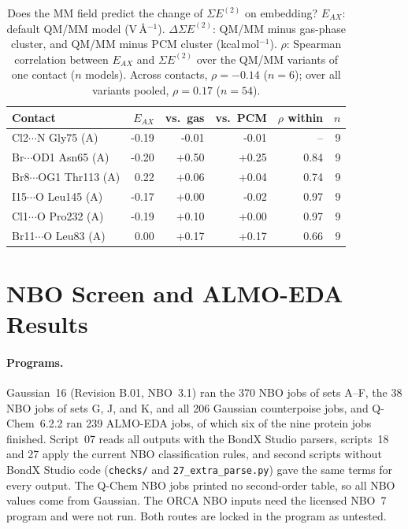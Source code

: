 \documentclass[journal=jcisd8,manuscript=suppinfo]{achemso}
\newcommand{\BX}{BondX Studio}
\begin{document}
\begin{singlespace}
\begin{table}[!htbp]\centering\small
\caption{Does the MM field predict the change of $\Sigma E^{(2)}$ on embedding? $E_{AX}$: default QM/MM model (V\,\AA$^{-1}$). $\Delta\Sigma E^{(2)}$: QM/MM minus gas-phase cluster, and QM/MM minus PCM cluster (kcal\,mol$^{-1}$). $\rho$: Spearman correlation between $E_{AX}$ and $\Sigma E^{(2)}$ over the QM/MM variants of one contact ($n$ models). Across contacts, $\rho = -0.14$ ($n = 6$); over all variants pooled, $\rho = 0.17$ ($n = 54$).}\label{tab:m12}
\begin{tabular}{lrrrrr}\toprule Contact & $E_{AX}$ & vs.\ gas & vs.\ PCM & $\rho$ within & $n$\\\midrule
Cl2$\cdots$N Gly75 (A) & -0.19 & -0.01 & -0.01 & -- & 9\\
Br$\cdots$OD1 Asn65 (A) & -0.20 & +0.50 & +0.25 & 0.84 & 9\\
Br8$\cdots$OG1 Thr113 (A) & 0.22 & +0.06 & +0.04 & 0.74 & 9\\
I15$\cdots$O Leu145 (A) & -0.17 & +0.00 & -0.02 & 0.97 & 9\\
Cl1$\cdots$O Pro232 (A) & -0.19 & +0.10 & +0.00 & 0.97 & 9\\
Br11$\cdots$O Leu83 (A) & 0.00 & +0.17 & +0.17 & 0.66 & 9\\
\bottomrule\end{tabular}\end{table}

\section{NBO Screen and ALMO-EDA Results}
\label{sec:qm}

\paragraph{Programs.} Gaussian~16 (Revision B.01, NBO~3.1) ran the 370 NBO jobs of sets A--F, the 38 NBO jobs of sets G, J, and K, and all 206 Gaussian counterpoise jobs, and Q-Chem~6.2.2 ran 239 ALMO-EDA jobs, of which six of the nine protein jobs finished. Script~07 reads all outputs with the \BX{} parsers, scripts~18 and 27 apply the current NBO classification rules, and second scripts without \BX{} code (\texttt{checks/} and \texttt{27\_extra\_parse.py}) gave the same terms for every output. The Q-Chem NBO jobs printed no second-order table, so all NBO values come from Gaussian. The ORCA NBO inputs need the licensed NBO~7 program and were not run. Both routes are locked in the program as untested.


\end{singlespace}
\end{document}
